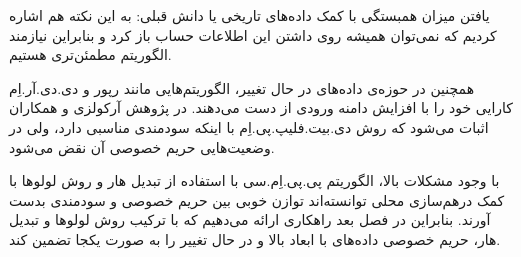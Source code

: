  یافتن میزان همبستگی با کمک داده‌های تاریخی یا دانش قبلی: به این نکته هم اشاره کردیم که نمی‌توان همیشه روی داشتن این اطلاعات حساب باز کرد و بنابراین نیازمند الگوریتم مطمئن‌تری هستیم.


همچنین در حوزه‌ی داده‌های در حال تغییر، الگوریتم‌هایی مانند رپور و دی.دی.آر.اِم  کارایی خود را با افزایش دامنه ورودی از دست می‌دهند. در پژوهش آرکولزی و همکاران  اثبات می‌شود که روش دی.بیت.فلیپ.پی.اِم با اینکه سودمندی مناسبی دارد، ولی در وضعیت‌هایی حریم خصوصی آن نقض می‌شود. 

با وجود مشکلات بالا، الگوریتم پی.پی.اِم.سی با استفاده از تبدیل هار و روش لولوها با کمک درهم‌سازی محلی توانسته‌اند توازن خوبی بین حریم خصوصی و سودمندی بدست آورند. بنابراین در فصل بعد راهکاری ارائه می‌دهیم که با ترکیب روش لولوها و تبدیل هار، حریم خصوصی داده‌های با ابعاد بالا و در حال تغییر را به صورت یکجا تضمین کند. 




